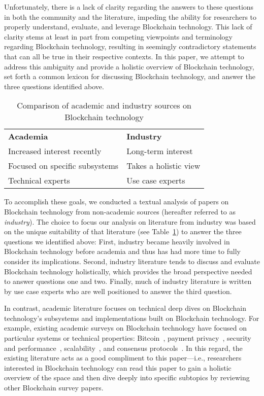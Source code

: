 Unfortunately, there is a lack of clarity regarding the answers to these questions in both the community and the literature, impeding the ability for researchers to properly understand, evaluate, and leverage Blockchain technology.
This lack of clarity stems at least in part from competing viewpoints and terminology regarding Blockchain technology, resulting in seemingly contradictory statements that can all be true in their respective contexts.
In this paper, we attempt to address this ambiguity and provide a holistic overview of Blockchain technology, set forth a common lexicon for discussing Blockchain technology, and answer the three questions identified above.

\begin{table}
	\centering
	
	\begin{tabular}{l|l}
		\textbf{Academia} & \textbf{Industry} \\

		
		Increased interest recently & Long-term interest \\
		Focused on specific subsystems & Takes a holistic view \\
		Technical experts & Use case experts \\ \hline
	\end{tabular}
	
	\caption{Comparison of academic and industry sources on Blockchain technology}
	\label{tab:sources}
\end{table}

To accomplish these goals, we conducted a textual analysis of papers on Blockchain technology from non-academic sources (hereafter referred to as \emph{industry}).
The choice to focus our analysis on literature from industry was based on the unique suitability of that literature (see Table~\ref{tab:sources}) to answer the three questions we identified above:
First, industry became heavily involved in Blockchain technology before academia and thus has had more time to fully consider its implications.
Second, industry literature tends to discuss and evaluate Blockchain technology holistically, which provides the broad perspective needed to answer questions one and two.
Finally, much of industry literature is written by use case experts who are well positioned to answer the third question.

In contrast, academic literature focuses on technical deep dives on Blockchain technology's subsystems and implementations built on Blockchain technology.
For example, existing academic surveys on Blockchain technology have focused on particular systems or technical properties: Bitcoin~\cite{BMC+15,Narayanan17}, payment privacy~\cite{Conti17}, security and performance~\cite{Gervais16}, scalability~\cite{Croman16}, and consensus protocols~\cite{Bano17,garay2018consensus}.
In this regard, the existing literature acts as a good compliment to this paper---i.e., researchers interested in Blockchain technology can read this paper to gain a holistic overview of the space and then dive deeply into specific subtopics by reviewing other Blockchain survey papers.

